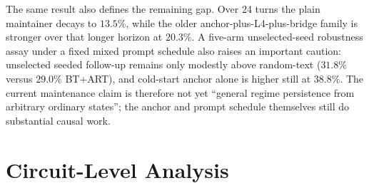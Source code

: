 \documentclass{article}
\begin{document}
The same result also defines the remaining gap.
Over 24 turns the plain maintainer decays to $13.5\%$, while the older
anchor-plus-L4-plus-bridge family is stronger over that longer horizon at $20.3\%$.
A five-arm unselected-seed robustness assay under a fixed mixed prompt schedule also raises an
important caution:
unselected seeded follow-up remains only modestly above random-text
($31.8\%$ versus $29.0\%$ BT+ART), and cold-start anchor alone is higher still at $38.8\%$.
The current maintenance claim is therefore not yet ``general regime persistence from arbitrary
ordinary states''; the anchor and prompt schedule themselves still do substantial causal work.


\section{Circuit-Level Analysis}
\label{sec:circuits}
\end{document}
